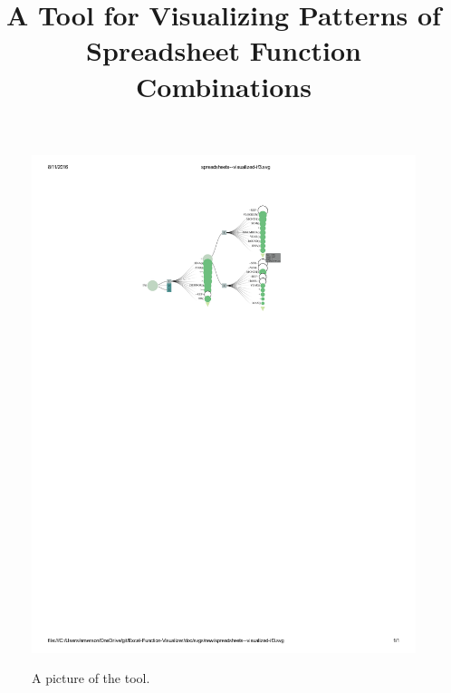 \documentclass[conference]{IEEEtran}
\begin{document}
 \title{A Tool for Visualizing Patterns of Spreadsheet Function
		Combinations}
	
	
	\author{
	}
	
	
	\maketitle
	
	\begin{figure}[t] \includegraphics[width = \textwidth]{IFargslabel} \caption{A
			picture of the tool.} \centering \label{fig:fullpic} \end{figure}
	
\end{document}
